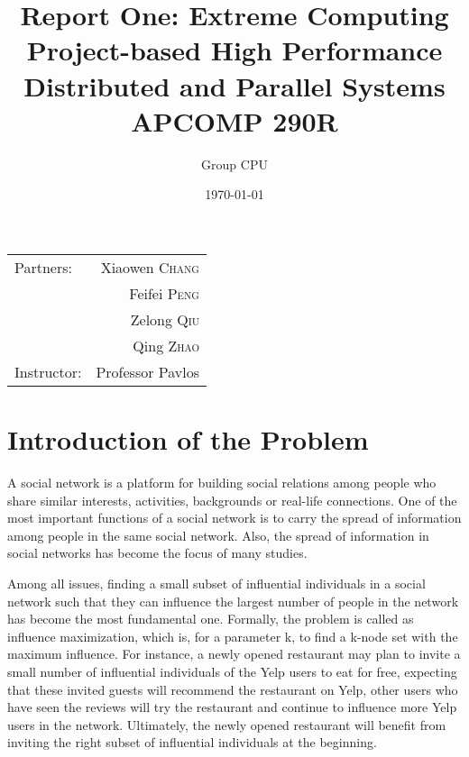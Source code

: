 \documentclass{article}
\title{Report One: Extreme Computing \\ Project-based High Performance Distributed and Parallel Systems \\ APCOMP 290R} %
\author{Group CPU} %
\date{\today} %
\begin{document}
\maketitle %

\begin{center}
\begin{tabular}{l r}
Partners: & Xiaowen \textsc{Chang} \\ %
& Feifei \textsc{Peng} \\
& Zelong \textsc{Qiu} \\
& Qing \textsc{Zhao} \\
Instructor: & Professor Pavlos %
\end{tabular}
\end{center}



\section{Introduction of the Problem}

A social network is a platform for building social relations among people who share similar interests, activities, backgrounds or real-life connections. One of the most important functions of a social network is to carry the spread of information among people in the same social network. Also, the spread of information in social networks has become the focus of many studies. 

\vspace{0.1in}

Among all issues, finding a small subset of influential individuals in a social network such that they can influence the largest number of people in the network has become the most fundamental one. Formally, the problem is called as influence maximization, which is, for a parameter k, to find a k-node set with the maximum influence. For instance, a newly opened restaurant may plan to invite a small number of influential individuals of the Yelp users to eat for free, expecting that these invited guests will recommend the restaurant on Yelp, other users who have seen the reviews will try the restaurant and continue to influence more Yelp users in the network. Ultimately, the newly opened restaurant will benefit from inviting the right subset of influential individuals at the beginning.
\end{document}
